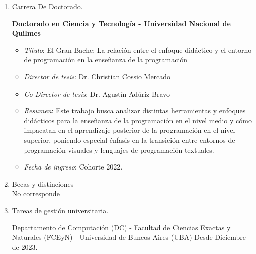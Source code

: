 \begin{enumerate}[leftmargin=0.8cm]

  \item[b)]{Carrera De Doctorado.

    \textbf{Doctorado en Ciencia y Tecnología - Universidad Nacional de Quilmes}

    \begin{itemize}[leftmargin=0.2cm]
        \item[] \emph{Título}: El Gran Bache: La relación entre el enfoque didáctico y el entorno de programación en la enseñanza de la programación
        \item[] \emph{Director de tesis}: Dr. Christian Cossio Mercado
        \item[] \emph{Co-Director de tesis}: Dr. Agustín Adúriz Bravo
        \item[] \emph{Resumen}: Este trabajo busca analizar distintas herramientas y enfoques didácticos para la enseñanza de la programación en el nivel medio y cómo impacatan en el aprendizaje posterior de la programación en el nivel superior, poniendo especial énfasis en la transición entre entornos de programación visuales y lenguajes de programación textuales.
        \item[] \emph{Fecha de ingreso}: Cohorte 2022.
    \end{itemize}

  }

  \item[c)]{Becas y distinciones
    \\ No corresponde
  }

  \item[d)]{Tareas de gestión universitaria.

    \begin{itemize}[leftmargin=0.2cm]

      {Departamento de Computación (DC) - Facultad de Ciencias Exactas y Naturales (FCEyN) - Universidad de Buneos Aires (UBA)}
      {Desde Diciembre de 2023.}

    \end{itemize}

  }


\end{enumerate}
